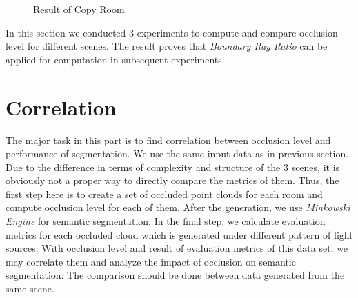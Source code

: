 \documentclass[11pt, a4paper,oneside,chapterprefix=false]{scrbook}
\begin{document}
\begin{figure}[H]
    \centering
    \caption{Result of Copy Room}
    \label{fig:result of copy room}
\end{figure}

In this section we conducted 3 experiments to compute and compare occlusion level for different scenes. The result proves that \emph{Boundary Ray Ratio} can be applied for computation in subsequent experiments.

\section{Correlation}

The major task in this part is to find correlation between occlusion level and performance of segmentation. We use the same input data as in previous section. Due to the difference in terms of complexity and structure of the 3 scenes, it is obviously not a proper way to directly compare the metrics of them. Thus, the first step here is to create a set of occluded point clouds for each room and compute occlusion level for each of them. After the generation, we use \emph{Minkowski Engine} for semantic segmentation. In the final step, we calculate evaluation metrics for each occluded cloud which is generated under different pattern of light sources. With occlusion level and result of evaluation metrics of this data set, we may correlate them and analyze the impact of occlusion on semantic segmentation. The comparison should be done between data generated from the same scene.
\end{document}
